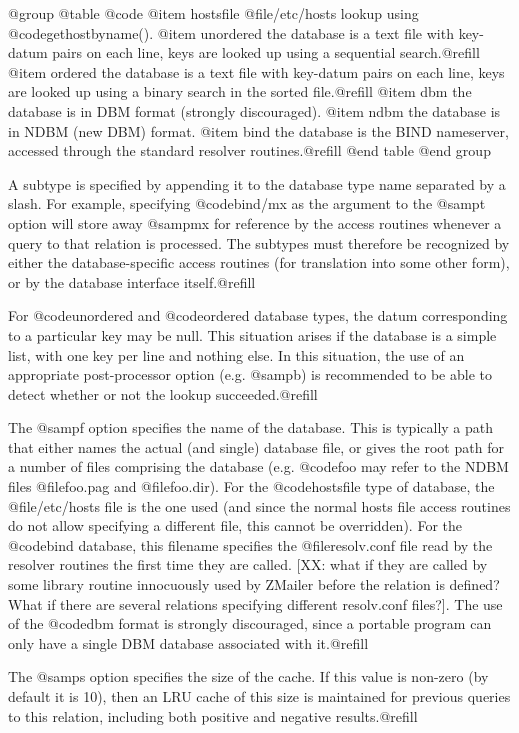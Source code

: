 {{@group
@table @code
@item hostsfile
@file{/etc/hosts} lookup using @code{gethostbyname()}.
@item unordered
the database is a text file with key-datum pairs on each line,
keys are looked up using a sequential search.@refill
@item ordered
the database is a text file with key-datum pairs on each line, keys are
looked up using a binary search in the sorted file.@refill
@item dbm
the database is in DBM format (strongly discouraged).
@item ndbm
the database is in NDBM (new DBM) format.
@item bind
the database is the BIND nameserver, accessed through the standard resolver
routines.@refill
@end table
@end group

A subtype is specified by appending it to the database type name
separated by a slash.  For example, specifying @code{bind/mx} as the
argument to the @samp{t} option will store away @samp{mx} for reference
by the access routines whenever a query to that relation is processed.
The subtypes must therefore be recognized by either the
database-specific access routines (for translation into some other
form), or by the database interface itself.@refill

For @code{unordered} and @code{ordered} database types, the datum
corresponding to a particular key may be null.  This situation arises
if the database is a simple list, with one key per line and nothing
else.  In this situation, the use of an appropriate post-processor
option (e.g. @samp{b}) is recommended to be able to detect whether or
not the lookup succeeded.@refill

The @samp{f} option specifies the name of the database.  This is
typically a path that either names the actual (and single) database
file, or gives the root path for a number of files comprising the
database (e.g. @code{foo} may refer to the NDBM files @file{foo.pag}
and @file{foo.dir}).  For the @code{hostsfile} type of database, the
@file{/etc/hosts} file is the one used (and since the normal hosts file
access routines do not allow specifying a different file, this cannot
be overridden).  For the @code{bind} database, this filename specifies
the @file{resolv.conf} file read by the resolver routines the first
time they are called. [XX: what if they are called by some library
routine innocuously used by ZMailer before the relation is defined?
What if there are several relations specifying different resolv.conf
files?].  The use of the @code{dbm} format is strongly discouraged,
since a portable program can only have a single DBM database associated
with it.@refill

The @samp{s} option specifies the size of the cache.  If this value is non-zero
(by default it is 10), then an LRU cache of this size is maintained for
previous queries to this relation, including both positive and negative
results.@refill

}}
